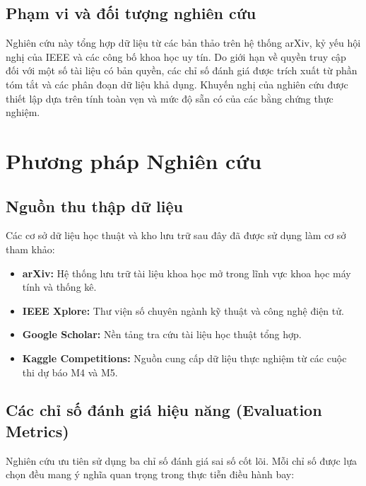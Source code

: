 \documentclass[12pt,a4paper]{article}
\begin{document}
\subsection{Phạm vi và đối tượng nghiên cứu}

Nghiên cứu này tổng hợp dữ liệu từ các bản thảo trên hệ thống arXiv, kỷ yếu hội nghị của IEEE và các công bố khoa học uy tín. Do giới hạn về quyền truy cập đối với một số tài liệu có bản quyền, các chỉ số đánh giá được trích xuất từ phần tóm tắt và các phân đoạn dữ liệu khả dụng. Khuyến nghị của nghiên cứu được thiết lập dựa trên tính toàn vẹn và mức độ sẵn có của các bằng chứng thực nghiệm.


\section{Phương pháp Nghiên cứu}

\subsection{Nguồn thu thập dữ liệu}

Các cơ sở dữ liệu học thuật và kho lưu trữ sau đây đã được sử dụng làm cơ sở tham khảo:

\begin{itemize}
    \item \textbf{arXiv:} Hệ thống lưu trữ tài liệu khoa học mở trong lĩnh vực khoa học máy tính và thống kê.
    \item \textbf{IEEE Xplore:} Thư viện số chuyên ngành kỹ thuật và công nghệ điện tử.
    \item \textbf{Google Scholar:} Nền tảng tra cứu tài liệu học thuật tổng hợp.
    \item \textbf{Kaggle Competitions:} Nguồn cung cấp dữ liệu thực nghiệm từ các cuộc thi dự báo M4 và M5.
\end{itemize}

\subsection{Các chỉ số đánh giá hiệu năng (Evaluation Metrics)}

Nghiên cứu ưu tiên sử dụng ba chỉ số đánh giá sai số cốt lõi. Mỗi chỉ số được lựa chọn đều mang ý nghĩa quan trọng trong thực tiễn điều hành bay:
\end{document}
